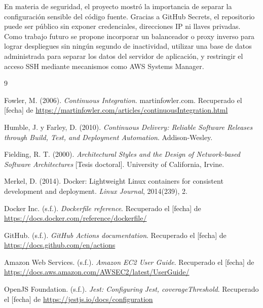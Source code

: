 \documentclass[12pt,letterpaper]{article}
\begin{document}
En materia de seguridad, el proyecto mostró la importancia de separar la configuración sensible del código fuente. Gracias a GitHub Secrets, el repositorio puede ser público sin exponer credenciales, direcciones IP ni llaves privadas. Como trabajo futuro se propone incorporar un balanceador o proxy inverso para lograr despliegues sin ningún segundo de inactividad, utilizar una base de datos administrada para separar los datos del servidor de aplicación, y restringir el acceso SSH mediante mecanismos como AWS Systems Manager.

\begin{thebibliography}{9}

Fowler, M. (2006). \emph{Continuous Integration}. martinfowler.com. Recuperado el [fecha] de \url{https://martinfowler.com/articles/continuousIntegration.html}

Humble, J. y Farley, D. (2010). \emph{Continuous Delivery: Reliable Software Releases through Build, Test, and Deployment Automation}. Addison-Wesley.

Fielding, R. T. (2000). \emph{Architectural Styles and the Design of Network-based Software Architectures} [Tesis doctoral]. University of California, Irvine.

Merkel, D. (2014). Docker: Lightweight Linux containers for consistent development and deployment. \emph{Linux Journal}, 2014(239), 2.

Docker Inc. (s.f.). \emph{Dockerfile reference}. Recuperado el [fecha] de \url{https://docs.docker.com/reference/dockerfile/}

GitHub. (s.f.). \emph{GitHub Actions documentation}. Recuperado el [fecha] de \url{https://docs.github.com/en/actions}

Amazon Web Services. (s.f.). \emph{Amazon EC2 User Guide}. Recuperado el [fecha] de \url{https://docs.aws.amazon.com/AWSEC2/latest/UserGuide/}

OpenJS Foundation. (s.f.). \emph{Jest: Configuring Jest, coverageThreshold}. Recuperado el [fecha] de \url{https://jestjs.io/docs/configuration}

\end{thebibliography}
\end{document}
